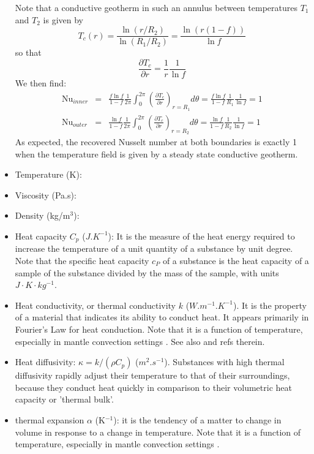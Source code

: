 \begin{itemize}
Note that a conductive geotherm in such an annulus between temperatures $T_1$ and $T_2$ is given by 
\[
T_c(r)=\frac{\ln (r/R_2)}{\ln(R_1/R_2)} = \frac{\ln(r(1-f))}{\ln f}
\]
so that 
\[
\frac{\partial T_c}{\partial r} = \frac{1}{r}\frac{1}{\ln f} 
\]
We then find:
\begin{eqnarray}
\text{Nu}_{inner} 
&=& \frac{f \ln f}{1-f} \frac{1}{2\pi} \int_0^{2\pi} \left( \frac{\partial T_c}{\partial r} \right)_{r=R_1} d\theta
= \frac{f \ln f}{1-f} \frac{1}{R_1}\frac{1}{\ln f} 
= 1 \\
\text{Nu}_{outer} 
&=& \frac{\ln f}{1-f} \frac{1}{2\pi} \int_0^{2\pi} \left( \frac{\partial T_c}{\partial r} \right)_{r=R_2} d\theta 
= \frac{\ln f}{1-f} \frac{1}{R_2}\frac{1}{\ln f} = 1 
\end{eqnarray}
As expected, the recovered Nusselt number at both boundaries is exactly 1 when the temperature field is
given by a steady state conductive geotherm.


 
\item Temperature (K):
\item Viscosity (Pa.s):
\item Density (kg/m$^3$):
\item Heat capacity $C_p$ ($J.K^{-1}$): It is the measure of the heat energy required to increase the 
temperature of a unit quantity of a substance by unit degree. Note that the specific heat capacity $c_P$ of a 
substance is the heat capacity of a sample of the substance divided by the mass of the sample, with units $J\cdot K\cdot kg^{-1}$.
\item Heat conductivity, or thermal conductivity $k$ ($W.m^{-1}.K^{-1}$). It is the property of a material that indicates its ability to conduct     heat. It appears primarily in Fourier's Law for heat conduction.
Note that it is a function of temperature, especially in mantle convection settings \cite{mika13}. See also \cite{boca99} and refs therein.

\item Heat diffusivity: $\kappa=k/(\rho C_p)$ ($m^2.s^{-1}$). Substances with high thermal diffusivity rapidly adjust their temperature to that of their surroundings, because they 
conduct heat quickly in comparison to their volumetric heat capacity or 'thermal bulk'.
\item thermal expansion $\alpha$ (K$^{-1}$): it is the tendency of a matter to change in volume in response to a change in temperature. Note that it is a function of temperature, especially in mantle convection settings \cite{mika13}.

\end{itemize}


